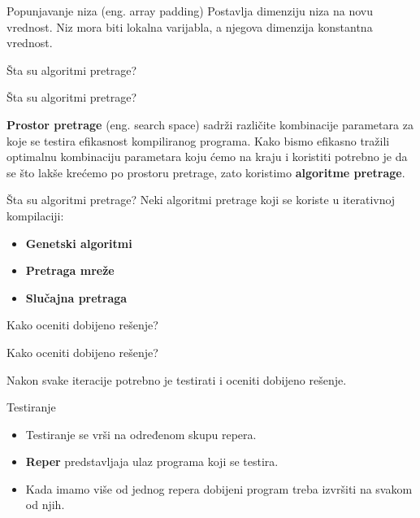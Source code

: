 \documentclass[10pt]{beamer}
\begin{document}
\begin{frame}[fragile]{Popunjavanje niza (eng. array padding)}
Postavlja dimenziju niza na novu vrednost. Niz mora biti lokalna varijabla, a njegova dimenzija konstantna vrednost.
\end{frame}

\begin{frame}[standout]
  Šta su algoritmi pretrage?
\end{frame}
\begin{frame}[fragile]{Šta su algoritmi pretrage?}

\textbf{Prostor pretrage} (eng. search space) sadrži različite kombinacije parametara za koje se testira efikasnost kompiliranog 
programa. Kako bismo efikasno tražili optimalnu kombinaciju parametara koju ćemo na kraju i koristiti potrebno je da se što 
lakše krećemo po prostoru pretrage, zato koristimo \textbf{algoritme pretrage}.
\end{frame}

\begin{frame}[fragile]{Šta su algoritmi pretrage?}
Neki algoritmi pretrage koji se koriste u iterativnoj kompilaciji:
\begin{itemize}[<+- | alert@+>]
    \item \textbf{Genetski algoritmi}
    \item \textbf{Pretraga mreže}
    \item \textbf{Slučajna pretraga}

  \end{itemize}
\end{frame}

\begin{frame}[standout]
  Kako oceniti dobijeno rešenje?
\end{frame}

\begin{frame}{Kako oceniti dobijeno rešenje?}
  
  Nakon svake iteracije potrebno je testirati i oceniti dobijeno rešenje.

\end{frame}

\begin{frame}{Testiranje}

  \begin{itemize}[<+- | alert@+>]
    \item Testiranje se vrši na određenom skupu repera.
    \item \textbf{Reper} predstavljaja ulaz programa koji se testira.
    \item Kada imamo više od jednog repera dobijeni program treba izvršiti na svakom od njih.
  \end{itemize}

\end{frame}
\end{document}
